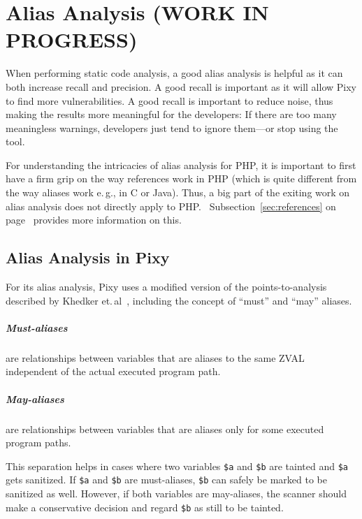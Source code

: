 \chapter{Alias Analysis (WORK IN PROGRESS)}

When performing static code analysis, a good alias analysis is helpful as it can both increase recall and precision. A good recall is important as it will allow Pixy to find more vulnerabilities. A good recall is important to reduce noise, thus making the results more meaningful for the developers: If there are too many meaningless warnings, developers just tend to ignore them---or stop using the tool.~\cite{understanding-value}

For understanding the intricacies of alias analysis for PHP, it is important to first have a firm grip on the way references work in PHP (which is quite different from the way aliases work e.\,g., in C or Java). Thus, a big part of the exiting work on alias analysis does not directly apply to PHP.~\cite[page~24]{pixy} Subsection~\ref{sec:references} on page~\pageref{sec:references} provides more information on this.

\section{Alias Analysis in Pixy}

For its alias analysis, Pixy uses a modified version of the points-to-analysis described by Khedker et.\,al~\cite[page 119ff]{data-flow-analysis}, including the concept of ``must'' and ``may'' aliases.

\paragraph{Must-aliases} are relationships between variables that are aliases to the same ZVAL independent of the actual executed program path.

\paragraph{May-aliases} are relationships between variables that are aliases only for some executed program paths.

This separation helps in cases where two variables \texttt{\$a} and \texttt{\$b} are tainted and \texttt{\$a} gets sanitized. If \texttt{\$a} and \texttt{\$b} are must-aliases, \texttt{\$b} can safely be marked to be sanitized as well. However, if both variables are may-aliases, the scanner should make a conservative decision and regard \texttt{\$b} as still to be tainted.

